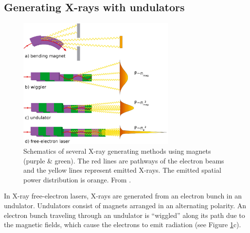 \subsection{Generating X-rays with undulators}\label{sec:undulator}
\begin{figure}[t]
	\centering
	\includegraphics[width=0.70\textwidth]{images/bending-to-FEL.png}
	\caption[Schematics of several X-ray generating methods.]{Schematics of several X-ray generating methods using magnets (purple \& green). The red lines are pathways of the electron beams and the yellow lines represent emitted X-rays. The emitted spatial power distribution is orange. From \citep{Rupp-2013-Thesis}.}
	\label{fig:undulator}
\end{figure}
In X-ray free-electron lasers, X-rays are generated from an electron bunch in an undulator. Undulators consist of magnets arranged in an alternating polarity. An electron bunch traveling through an undulator is ``wiggled'' along its path due to the magnetic fields, which cause the electrons to emit radiation (see Figure \ref{fig:undulator}c).
